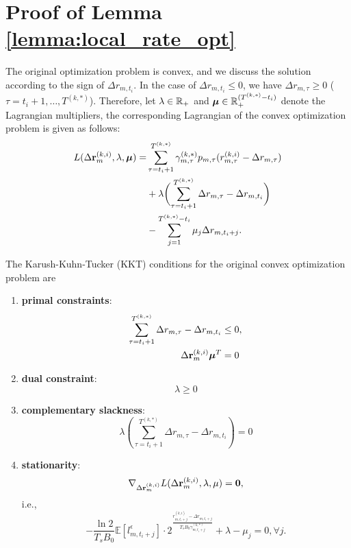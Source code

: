 \appendices

\section{ Proof of Lemma \ref{lemma:local_rate_opt} }
\label{append_1}
The original optimization problem is convex, and we discuss the solution according to the sign of $\Delta{r}_{m,t_i}$. In the case of $\Delta{r}_{m,t_i} \leq 0$, we have $\Delta{r}_{m,\tau} \geq 0$ ($\tau=t_i+1, \dots, T^{(k,*)}$).
Therefore, let $\lambda \in \mathbb{R}_+$ and $\boldsymbol{\mu} \in \mathbb{R}^{(T^{(k,*)}-t_i)}_+$ denote the Lagrangian multipliers, the corresponding Lagrangian of the convex optimization problem is given as follows:
\begin{align*}
    L( \Delta{\slide{r}}^{(k,i)}_{m}, \lambda, \vecG{\mu} ) =
    &\sum_{\tau=t_i+1}^{T^{(k,*)}} \gamma^{(k,*)}_{m,\tau} p_{m,\tau}( r^{(k,i)}_{m,\tau} - \Delta{r}_{m,\tau} )
    \nonumber\\
    &+ \lambda \Paren{ \sum_{\tau=t_i+1}^{T^{(k,*)}} \Delta{r}_{m,\tau} - \Delta{r}_{m,t_i} }
    \nonumber\\
    &- \sum_{j=1}^{T^{(k,*)}-t_i} \mu_{j} \Delta{r}_{m,t_i+j}.
\end{align*}

The Karush-Kuhn-Tucker (KKT) \cite{boyd-convex} conditions for the original convex optimization problem are
\begin{enumerate}
    \item \textbf{primal constraints}:
    \begin{align*}
        \sum_{\tau=t_i+1}^{T^{(k,*)}} \Delta{r}_{m,\tau} - \Delta{r}_{m,t_i} &\leq 0,
        \\
        \Delta{{\mathbf{r}}}^{(k,i)}_{m} \boldsymbol{\mu}^T &= 0
    \end{align*}
    \item \textbf{dual constraint}:
    $$
    \lambda \geq 0
    $$
    \item \textbf{complementary slackness}:
    $$
    \lambda (\sum_{\tau=t_i+1}^{T^{(k,*)}} \Delta{r}_{m,\tau} - \Delta{r}_{m,t_i}) = 0
    $$
    \item \textbf{stationarity}:
    $$
    \nabla_{\Delta{{\mathbf{r}}}^{(k,i)}_{m}} L( \Delta{{\mathbf{r}}}^{(k,i)}_{m}, \lambda, \mathbf{\mu} )
    = \mathbf{0},
    $$
    i.e.,
    $$
    - \frac{\ln{2}}{T_sB_0} \mathbb{E}[l^{\epsilon}_{m,t_i+j}] \cdot 2^{\frac{r^{(k,i)}_{m,t_i+j} - \Delta{r}_{m,t_i+j}}{T_sB_0 \gamma^{(k,*)}_{m,t_i+j}}} + \lambda - \mu_j = 0,
    \forall j.
    $$
\end{enumerate}


